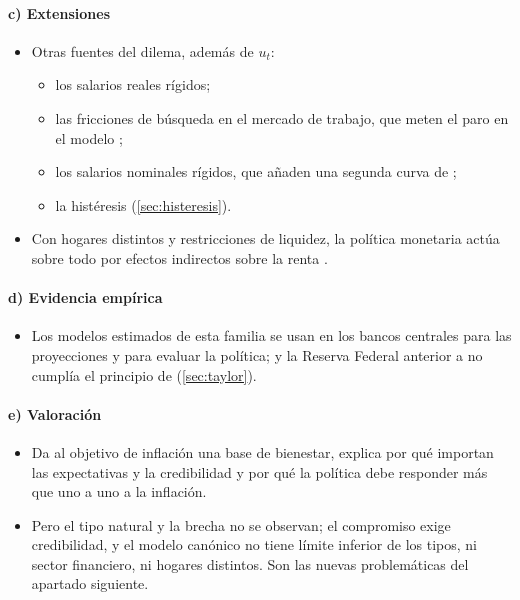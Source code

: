 \documentclass[11pt]{article}
\begin{document}
\paragraph{c) Extensiones}

\begin{itemize}
\item Otras fuentes del dilema, además de $u_t$:
  \begin{itemize}
  \item los salarios reales rígidos\nocite{BlanchardGali2007Real};
  \item las fricciones de búsqueda en el mercado de trabajo, que meten el paro en el modelo\nocite{BlanchardGali2010Labor}  ;
  \item los salarios nominales rígidos, que añaden una segunda curva de \nocite{ErcegHendersonLevin2000Optimal};
  \item la histéresis (\ref{sec:histeresis}).
  \end{itemize}
\item Con hogares distintos y restricciones de liquidez, la política monetaria actúa sobre todo por efectos indirectos sobre la renta\nocite{KaplanMollViolante2018Monetary} .
\end{itemize}

\paragraph{d) Evidencia empírica}

\begin{itemize}
\item Los modelos estimados de esta familia\nocite{SmetsWouters2003Estimated,SmetsWouters2007Shocks} se usan en los bancos centrales para las proyecciones y para evaluar la política; y la Reserva Federal anterior a  no cumplía el principio de  (\ref{sec:taylor}).
\end{itemize}

\paragraph{e) Valoración}

\begin{itemize}
\item Da al objetivo de inflación una base de bienestar, explica por qué importan las expectativas y la credibilidad y por qué la política debe responder más que uno a uno a la inflación.
\item Pero el tipo natural y la brecha no se observan; el compromiso exige credibilidad, y el modelo canónico no tiene límite inferior de los tipos, ni sector financiero, ni hogares distintos. Son las nuevas problemáticas del apartado siguiente.
\end{itemize}
\end{document}
